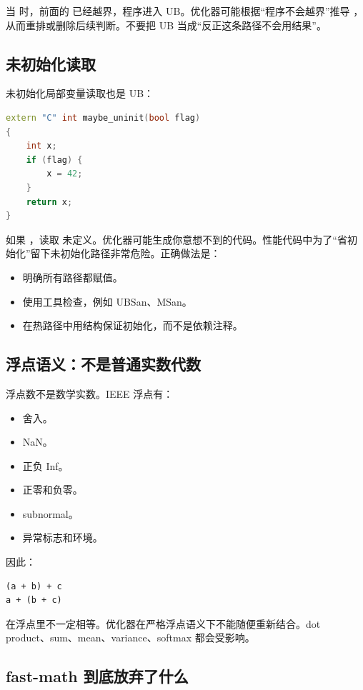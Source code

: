 当  时，前面的  已经越界，程序进入 UB。优化器可能根据“程序不会越界”推导 ，从而重排或删除后续判断。不要把 UB 当成“反正这条路径不会用结果”。

\subsection{未初始化读取}

未初始化局部变量读取也是 UB：

\begin{lstlisting}[language=C++]
extern "C" int maybe_uninit(bool flag)
{
    int x;
    if (flag) {
        x = 42;
    }
    return x;
}
\end{lstlisting}

如果 ，读取  未定义。优化器可能生成你意想不到的代码。性能代码中为了“省初始化”留下未初始化路径非常危险。正确做法是：

\begin{itemize}
  \item 明确所有路径都赋值。
  \item 使用工具检查，例如 UBSan、MSan。
  \item 在热路径中用结构保证初始化，而不是依赖注释。
\end{itemize}

\subsection{浮点语义：不是普通实数代数}

浮点数不是数学实数。IEEE 浮点有：

\begin{itemize}
  \item 舍入。
  \item NaN。
  \item 正负 Inf。
  \item 正零和负零。
  \item subnormal。
  \item 异常标志和环境。
\end{itemize}

因此：

\begin{lstlisting}
(a + b) + c
a + (b + c)
\end{lstlisting}

在浮点里不一定相等。优化器在严格浮点语义下不能随便重新结合。dot product、sum、mean、variance、softmax 都会受影响。

\subsection{fast-math 到底放弃了什么}

